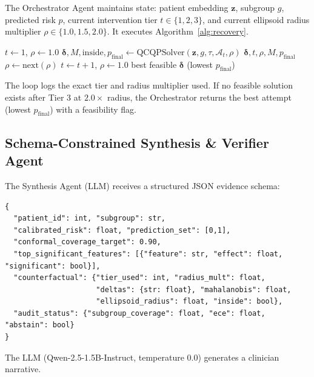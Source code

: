 \documentclass[11pt,a4paper]{article}
\theoremstyle{plain}
\begin{document}
The Orchestrator Agent maintains state: patient embedding $\mathbf{z}$, subgroup $g$, predicted risk $p$, current intervention tier $t \in \{1,2,3\}$, and current ellipsoid radius multiplier $\rho \in \{1.0, 1.5, 2.0\}$. It executes Algorithm~\ref{alg:recovery}.

\begin{algorithm}[htbp]
\caption{Counterfactual Recovery Loop (Loop 1)}
\label{alg:recovery}
\begin{algorithmic}[1]
    \State $t \gets 1$, $\rho \gets 1.0$
            \State $\boldsymbol{\delta}, M, \text{inside}, p_{\text{final}} \gets \text{QCQPSolver}(\mathbf{z}, g, \tau, \mathcal{A}_t, \rho)$
                \State \Return $\boldsymbol{\delta}, t, \rho, M, p_{\text{final}}$
            \EndIf
            \State $\rho \gets \text{next}(\rho)$ 
        \EndWhile
        \State $t \gets t+1$, $\rho \gets 1.0$ 
    \EndWhile
    \State \Return best feasible $\boldsymbol{\delta}$ (lowest $p_{\text{final}}$)
\EndFunction
\end{algorithmic}
\end{algorithm}

The loop logs the exact tier and radius multiplier used. If no feasible solution exists after Tier 3 at $2.0\times$ radius, the Orchestrator returns the best attempt (lowest $p_{\text{final}}$) with a feasibility flag.

\subsection{Schema-Constrained Synthesis \& Verifier Agent}
\label{sec:synthesis}

The Synthesis Agent (LLM) receives a structured JSON evidence schema:
\begin{verbatim}
{
  "patient_id": int, "subgroup": str,
  "calibrated_risk": float, "prediction_set": [0,1],
  "conformal_coverage_target": 0.90,
  "top_significant_features": [{"feature": str, "effect": float, "significant": bool}],
  "counterfactual": {"tier_used": int, "radius_mult": float,
                     "deltas": {str: float}, "mahalanobis": float,
                     "ellipsoid_radius": float, "inside": bool},
  "audit_status": {"subgroup_coverage": float, "ece": float, "abstain": bool}
}
\end{verbatim}
The LLM (Qwen-2.5-1.5B-Instruct, temperature 0.0) generates a clinician narrative.
\end{document}
